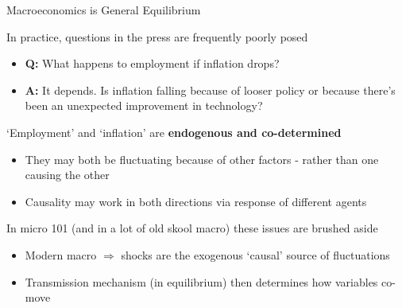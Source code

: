\begin{frame}{Macroeconomics is General Equilibrium}

In practice, questions in the press are frequently poorly posed
	\begin{itemize}
	\item	\textbf{Q:} What happens to employment if inflation drops?
	\item	\textbf{A:} It depends. Is inflation falling because of looser policy or because there's been an unexpected improvement in technology?
	\end{itemize}
\vspace{2mm}
`Employment' and `inflation' are \textbf{endogenous and co-determined}
	\begin{itemize}
	\item	They may both be fluctuating because of other factors - rather than one causing the other
	\item	Causality may work in both directions via response of different agents
	\end{itemize}
\vspace{2mm}	
In micro 101 (and in a lot of old skool macro) these issues are brushed aside
	\begin{itemize}
	\item	Modern macro $\Rightarrow$ shocks are the exogenous `causal' source of fluctuations
	\item	Transmission mechanism (in equilibrium) then determines how variables co-move
	\end{itemize}

\end{frame}


